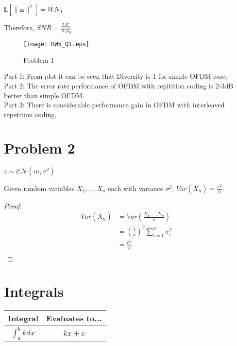 \documentclass{article}
\begin{document}
\begin{flushleft}
$\mathbb{E} \left[\|\mathbf{n}\|^2\right] = W N_0 $ \\
\end{flushleft}

\begin{flushleft}
Therefore,
$SNR = \frac{L E_s}{W N_0} $ \\
\end{flushleft}

\begin{figure}[H]
\centering
\texttt{[image: HW5\_Q1.eps]}
\caption{Problem 1}
\label{fig:prob1}
\end{figure}

\begin{flushleft}
    Part 1: From plot it can be seen that Diversity is 1 for simple OFDM case. \\
    Part 2: The error rate performance of OFDM with repitition coding is 2-3dB better than simple OFDM. \\
    Part 3: There is considerable performance gain in OFDM with interleaved repetition coding. \\
\end{flushleft}

\section*{Problem 2}
$v \sim \mathcal{CN} (m,\sigma^2)$

Given random variables $X_1, ..., X_n$  each with variance $\sigma^2$, $Var(\bar{X}_n) = \frac{\sigma^2}{n}$.

\begin{proof}
\begin{equation*}
\begin{split}
Var(\bar{X}_n) &= Var\left(\frac{X_1, ..., X_n}{n}\right) \\
&= (\frac{1}{n})^2 \sum_{i=1}^{n} \sigma_i^2 \\
&= \frac{\sigma^2}{n} \\
\end{split}
\end{equation*}
\end{proof}

\section{Integrals}
\begin{center}
\setlength{\tabcolsep}{1cm}
\def\arraystretch{2.5}
\begin{tabular}{c|c}
Integral & Evaluates to... \\
\hline
$\displaystyle \int_{a}^{b} k dx$ & $kx+c$
\end{tabular}
\end{center}
\end{document}
